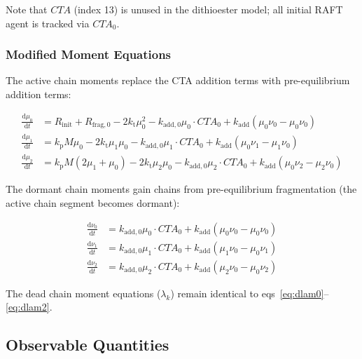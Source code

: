 \documentclass[journal=mamobx,manuscript=suppinfo]{achemso}
\begin{document}
\noindent Note that $\mathit{CTA}$ (index 13) is unused in the dithioester
model; all initial RAFT agent is tracked via $\mathit{CTA}_0$.

\subsubsection{Modified Moment Equations}

The active chain moments replace the CTA addition terms with pre-equilibrium
addition terms:

\begin{align}
  \frac{\mathrm{d}\mu_0}{\mathrm{d}t}
    &= R_{\mathrm{init}} + R_{\mathrm{frag},0}
       - 2 k_{\mathrm{t}} \mu_0^2
       - k_{\mathrm{add},0} \mu_0 \cdot \mathit{CTA}_0
       + k_{\mathrm{add}} (\mu_0 \nu_0 - \mu_0 \nu_0)
    \label{eq:dmu0_pre} \\[6pt]
  \frac{\mathrm{d}\mu_1}{\mathrm{d}t}
    &= k_{\mathrm{p}} M \mu_0
       - 2 k_{\mathrm{t}} \mu_1 \mu_0
       - k_{\mathrm{add},0} \mu_1 \cdot \mathit{CTA}_0
       + k_{\mathrm{add}} (\mu_0 \nu_1 - \mu_1 \nu_0)
    \label{eq:dmu1_pre} \\[6pt]
  \frac{\mathrm{d}\mu_2}{\mathrm{d}t}
    &= k_{\mathrm{p}} M (2\mu_1 + \mu_0)
       - 2 k_{\mathrm{t}} \mu_2 \mu_0
       - k_{\mathrm{add},0} \mu_2 \cdot \mathit{CTA}_0
       + k_{\mathrm{add}} (\mu_0 \nu_2 - \mu_2 \nu_0)
    \label{eq:dmu2_pre}
\end{align}

The dormant chain moments gain chains from pre-equilibrium fragmentation
(the active chain segment becomes dormant):

\begin{align}
  \frac{\mathrm{d}\nu_0}{\mathrm{d}t}
    &= k_{\mathrm{add},0} \mu_0 \cdot \mathit{CTA}_0
       + k_{\mathrm{add}} (\mu_0 \nu_0 - \mu_0 \nu_0)
    \label{eq:dnu0_pre} \\[6pt]
  \frac{\mathrm{d}\nu_1}{\mathrm{d}t}
    &= k_{\mathrm{add},0} \mu_1 \cdot \mathit{CTA}_0
       + k_{\mathrm{add}} (\mu_1 \nu_0 - \mu_0 \nu_1)
    \label{eq:dnu1_pre} \\[6pt]
  \frac{\mathrm{d}\nu_2}{\mathrm{d}t}
    &= k_{\mathrm{add},0} \mu_2 \cdot \mathit{CTA}_0
       + k_{\mathrm{add}} (\mu_2 \nu_0 - \mu_0 \nu_2)
    \label{eq:dnu2_pre}
\end{align}

The dead chain moment equations ($\lambda_k$) remain identical to
eqs~\ref{eq:dlam0}--\ref{eq:dlam2}.

\subsection{Observable Quantities}
\label{sec:observables}
\end{document}

